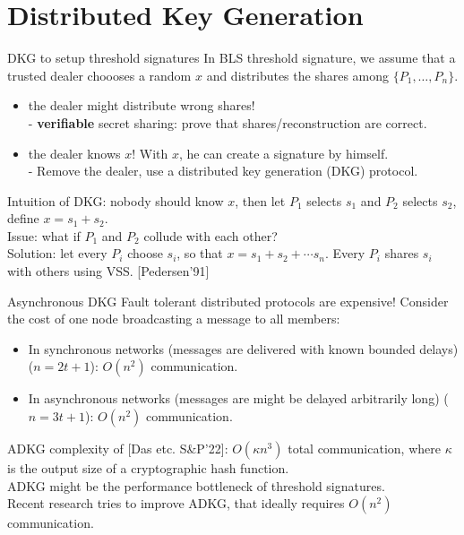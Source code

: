 \documentclass[10pt]{beamer}
\begin{document}
\section{Distributed Key Generation}
\begin{frame}{DKG to setup threshold signatures}
    In BLS threshold signature, we assume that a trusted dealer choooses a random $x$ and distributes the shares among $\{P_1,\dots, P_n\}$. \\
    \begin{itemize}
        \item the dealer might distribute wrong shares! \\ \pause 
              - \textbf{verifiable} secret sharing: prove that shares/reconstruction are correct.   \pause 
        \item the dealer knows $x$! With $x$, he can create a signature by himself. \\ \pause
            - Remove the dealer, use a distributed key generation (DKG) protocol. 
    \end{itemize}
    \pause 
    \vspace{0.5em}
    Intuition of DKG: nobody should know $x$, then let $P_1$ selects $s_1$ and $P_2$ selects $s_2$, define $x=s_1+s_2$. \\ \pause 
    \vspace{0.5em}
    Issue: what if $P_1$ and $P_2$ collude with each other? \\ \pause 
    Solution: let every $P_i$ choose $s_i$, so that $x=s_1+s_2+\cdots s_n$. Every $P_i$ shares $s_i$ with others using VSS.  [Pedersen'91]
\end{frame}

\begin{frame}{Asynchronous DKG}
Fault tolerant distributed protocols are expensive! Consider the cost of one node broadcasting a message to all members: 
\begin{itemize}
    \item In synchronous networks (messages are delivered with known bounded delays) ($n=2t+1$): $O(n^2)$ communication. 
    \item In asynchronous networks (messages are might be delayed arbitrarily long) ($n=3t+1$): $O(n^2)$ communication. 
\end{itemize}
ADKG complexity of [Das etc. S\&P'22]: $O(\kappa n^3)$ total communication, where $\kappa$ is the output size of a cryptographic hash function. \\
ADKG might be the performance bottleneck of threshold signatures. \\
\vspace{0.5em}
Recent research tries to improve ADKG, that ideally requires $O(n^2)$ communication. 
\end{frame}
\end{document}
